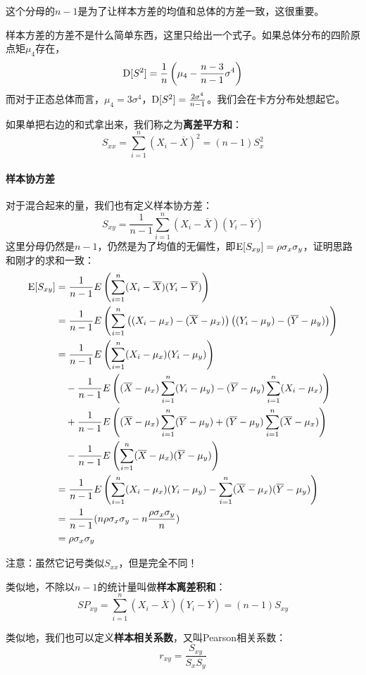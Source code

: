 这个分母的$n-1$是为了让样本方差的均值和总体的方差一致，这很重要。

样本方差的方差不是什么简单东西，这里只给出一个式子。如果总体分布的四阶原点矩$\mu_4$存在，
\[
\operatorname{D}[S^2]=\frac{1}{n}\left(\mu_4-\frac{n-3}{n-1}\sigma^4 \right)
\]
而对于正态总体而言，$\mu_4=3\sigma^4$，$\operatorname{D}[S^2]=\frac{2\sigma^4}{n-1}$。我们会在卡方分布处想起它。

如果单把右边的和式拿出来，我们称之为\textbf{离差平方和}：
\[
S_{xx} = \sum_{i=1}^n(X_i-\overline{X})^2=(n-1)S^2_x
\]

\paragraph{样本协方差}
对于混合起来的量，我们也有定义样本协方差：
\[
S_{xy} = \frac{1}{n-1}\sum_{i=1}^n(X_i-\overline{X})(Y_i-\overline{Y})
\]
这里分母仍然是$n-1$，仍然是为了均值的无偏性，即$\operatorname{E}[S_{xy}]=\rho\sigma_x\sigma_y$，证明思路和刚才的求和一致：
\begin{align*}
\operatorname{E}[S_{xy}] &= \frac{1}{n-1}E\left(\sum_{i=1}^n(X_i-\overline{X})(Y_i-\overline{Y})\right)\\
&= \frac{1}{n-1}E\left(\sum_{i=1}^n\left((X_i-\mu_x)-(\overline{X}-\mu_x)\right)\left((Y_i-\mu_y)-(\overline{Y}-\mu_y)\right)\right)\\
&= \frac{1}{n-1}E\left(\sum_{i=1}^n(X_i-\mu_x)(Y_i-\mu_y)\right)\\
&\quad-\frac{1}{n-1}E\left((\overline{X}-\mu_x)\sum_{i=1}^n(Y_i-\mu_y)
-(\overline{Y}-\mu_y)\sum_{i=1}^n(X_i-\mu_x)\right)\\
&\quad+\frac{1}{n-1}E\left((\overline{X}-\mu_x)\sum_{i=1}^n(\overline{Y}-\mu_y)
+(\overline{Y}-\mu_y)\sum_{i=1}^n(\overline{X}-\mu_x)\right)\\
&\quad-\frac{1}{n-1}E\left(\sum_{i=1}^n(\overline{X}-\mu_x)(\overline{Y}-\mu_y)\right)\\
&= \frac{1}{n-1}E\left(\sum_{i=1}^n(X_i-\mu_x)(Y_i-\mu_y)
-\sum_{i=1}^n(\overline{X}-\mu_x)(\overline{Y}-\mu_y)\right)\\
&= \frac{1}{n-1}(n\rho\sigma_x\sigma_y
-n\frac{\rho\sigma_x\sigma_y}{n})\\
&= \rho\sigma_x\sigma_y
\end{align*}

注意：虽然它记号类似$S_{xx}$，但是完全不同！

类似地，不除以$n-1$的统计量叫做\textbf{样本离差积和}：
\[
SP_{xy} = \sum_{i=1}^n(X_i-\overline{X})(Y_i-\overline{Y}) = (n-1)S_{xy}
\]

类似地，我们也可以定义\textbf{样本相关系数}，又叫Pearson相关系数：
\[
r_{xy} = \frac{S_{xy}}{S_xS_y}
\]

